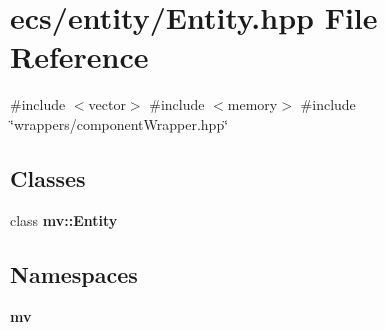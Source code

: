 \section{ecs/entity/\+Entity.hpp File Reference}
\label{_entity_8hpp}
{\ttfamily \#include $<$vector$>$}\newline
{\ttfamily \#include $<$memory$>$}\newline
{\ttfamily \#include \char`\"{}wrappers/component\+Wrapper.\+hpp\char`\"{}}\newline
\subsection*{Classes}
\begin{DoxyCompactItemize}
\item 
class \textbf{ mv\+::\+Entity}
\end{DoxyCompactItemize}
\subsection*{Namespaces}
\begin{DoxyCompactItemize}
\item 
 \textbf{ mv}
\end{DoxyCompactItemize}
